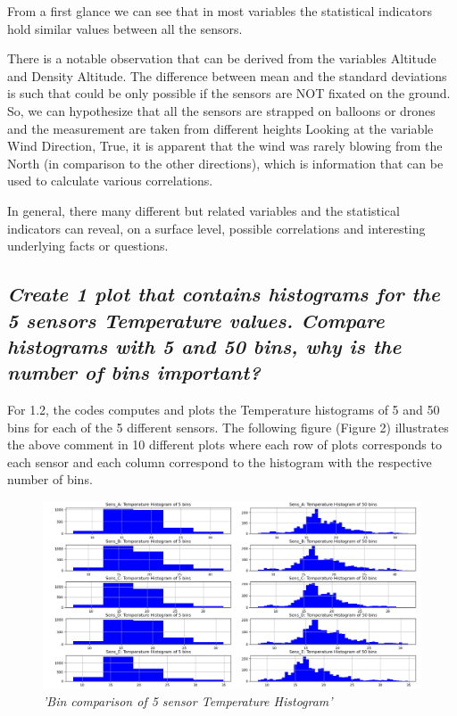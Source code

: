 \documentclass[a4paper,12pt]{article}
\begin{document}
From a first glance we can see that in most variables the statistical indicators hold similar values between all the sensors.




There is a notable observation that can be derived from the variables Altitude and Density Altitude. 
The difference between mean and the standard deviations is such that could be only possible if the sensors are NOT fixated on the ground. 
So, we can hypothesize that all the sensors are strapped on balloons or drones and the measurement are taken from different heights
Looking at the variable Wind Direction, True, it is apparent that the wind was rarely blowing from the North (in comparison to the other directions),
which is information that can be used to calculate various correlations.




In general, there many different but related variables and the statistical indicators can reveal, 
on a surface level, possible correlations and interesting underlying facts or questions.




\subsection{\it Create 1 plot that contains histograms for the 5 sensors Temperature values. Compare histograms with 5 and 50 bins, why is the number of bins important?}




For 1.2, the codes computes and plots the Temperature
histograms of 5 and 50 bins for each of the 5 different sensors. 
The following figure (Figure 2) illustrates the above comment in 10 different 
plots where each row of plots corresponds to each sensor and each column 
correspond to the histogram with the respective number of bins.



\begin{figure}[H]
\centering
\includegraphics[width=\textwidth]{Graphs/Bin_comparison_of_5_sensor_Temperature_Histogram.png}
\caption{\it'Bin comparison of 5 sensor Temperature Histogram'}
\end{figure}
\end{document}
